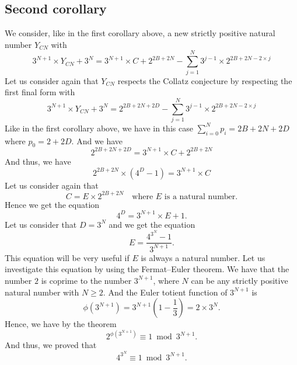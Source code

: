 \documentclass[11pt,a4paper]{article}
\theoremstyle{definition}
\begin{document}
\subsection*{Second corollary}
We consider, like in the first corollary above, a new strictly positive natural number
$Y_{CN}$ with
\begin{equation}
3^{N+1}\times Y_{CN}+3^{N}=3^{N+1}\times C+2^{2B+2N}-\sum_{j=1}^{N}3^{j-1}\times 2^{2B+2N-2\times j}
\end{equation}
Let us consider again that $Y_{CN}$ respects the Collatz conjecture by respecting the first
final form with
\begin{equation}
3^{N+1}\times Y_{CN}+3^{N}=2^{2B+2N+2D}-\sum_{j=1}^{N}3^{j-1}\times 2^{2B+2N-2\times j}
\end{equation}
Like in the first corollary above, we have in this case
$\sum_{i=0}^{N}p_i=2B+2N+2D$ where $p_0=2+2D$. And we have
\begin{equation}
2^{2B+2N+2D}=3^{N+1}\times C+2^{2B+2N}
\end{equation}
And thus, we have
\begin{equation}
2^{2B+2N}\times\left(4^{D}-1\right)=3^{N+1}\times C
\end{equation}
Let us consider again that
\begin{equation}
C=E\times 2^{2B+2N}\quad\text{where }E\text{ is a natural number.}
\end{equation}
Hence we get the equation
\begin{equation}
4^{D}=3^{N+1}\times E+1.
\end{equation}
Let us consider that $D=3^{N}$ and we get the equation
\begin{equation}
E=\frac{4^{3^{N}}-1}{3^{N+1}}.
\end{equation}
This equation will be very useful if $E$ is always a natural number. Let us investigate this
equation by using the Fermat--Euler theorem. We have that the number $2$ is coprime to the
number $3^{N+1}$, where $N$ can be any strictly positive natural number with $N\ge 2$. And
the Euler totient function of $3^{N+1}$ is
\begin{equation}
\phi\left(3^{N+1}\right)=3^{N+1}\left(1-\frac13\right)=2\times 3^{N}.
\end{equation}
Hence, we have by the theorem
\begin{equation}
2^{\phi\left(3^{N+1}\right)}\equiv 1\bmod 3^{N+1}.
\end{equation}
And thus, we proved that
\begin{equation}
4^{3^{N}}\equiv 1\bmod 3^{N+1}.
\end{equation}
\end{document}

